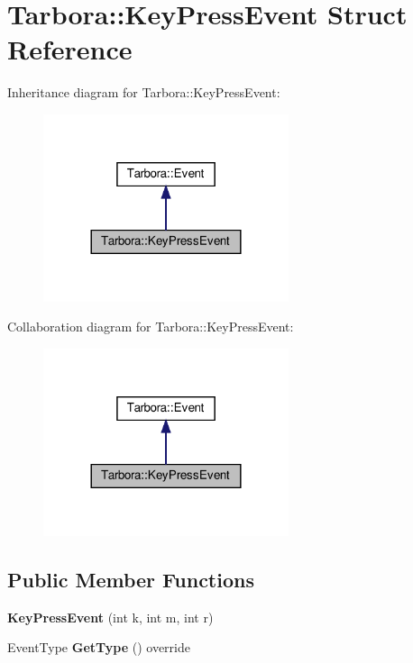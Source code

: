 \hypertarget{structTarbora_1_1KeyPressEvent}{}\section{Tarbora\+:\+:Key\+Press\+Event Struct Reference}
\label{structTarbora_1_1KeyPressEvent}


Inheritance diagram for Tarbora\+:\+:Key\+Press\+Event\+:\nopagebreak
\begin{figure}[H]
\begin{center}
\leavevmode
\includegraphics[width=204pt]{structTarbora_1_1KeyPressEvent__inherit__graph}
\end{center}
\end{figure}


Collaboration diagram for Tarbora\+:\+:Key\+Press\+Event\+:\nopagebreak
\begin{figure}[H]
\begin{center}
\leavevmode
\includegraphics[width=204pt]{structTarbora_1_1KeyPressEvent__coll__graph}
\end{center}
\end{figure}
\subsection*{Public Member Functions}
\begin{DoxyCompactItemize}
\item 
\mbox{\label{structTarbora_1_1KeyPressEvent_ab444edd82e06dca233362152b495a516}} 
{\bfseries Key\+Press\+Event} (int k, int m, int r)
\item 
\mbox{\label{structTarbora_1_1KeyPressEvent_a02819aee9bfbe7f7e62cbf7611dbf9ef}} 
Event\+Type {\bfseries Get\+Type} () override
\end{DoxyCompactItemize}

